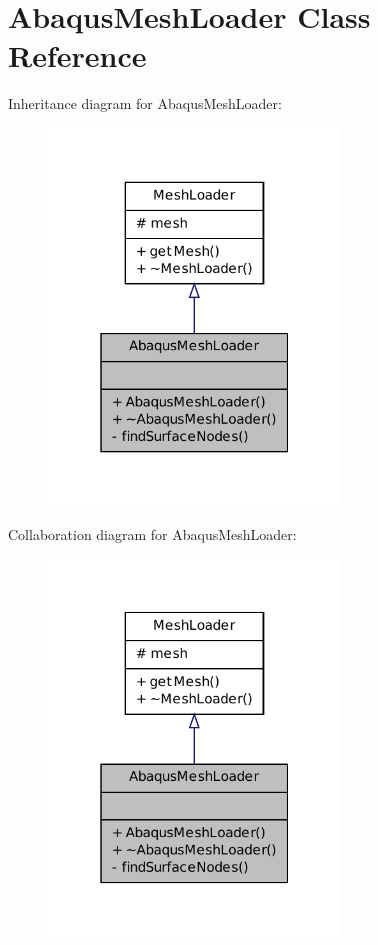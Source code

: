 \hypertarget{class_abaqus_mesh_loader}{
\section{AbaqusMeshLoader Class Reference}
\label{class_abaqus_mesh_loader}
}


Inheritance diagram for AbaqusMeshLoader:
\nopagebreak
\begin{figure}[H]
\begin{center}
\leavevmode
\includegraphics[width=220pt]{class_abaqus_mesh_loader__inherit__graph}
\end{center}
\end{figure}


Collaboration diagram for AbaqusMeshLoader:
\nopagebreak
\begin{figure}[H]
\begin{center}
\leavevmode
\includegraphics[width=220pt]{class_abaqus_mesh_loader__coll__graph}
\end{center}
\end{figure}
